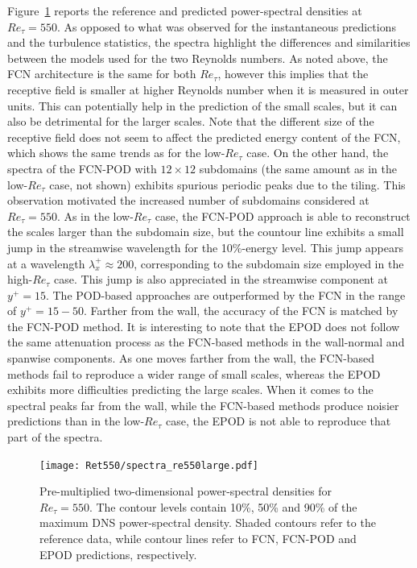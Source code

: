 Figure~\ref{fig:spectra550} reports the reference and predicted power-spectral densities at $Re_{\tau}=550$.
As opposed to what was observed for the instantaneous predictions and the turbulence statistics, the spectra highlight the differences and similarities between the models used for the two Reynolds numbers.
As noted above, the FCN architecture is the same for both $Re_{\tau}$, however this implies that the receptive field is smaller at higher Reynolds number when it is measured in outer units.
This can potentially help in the prediction of the small scales, but it can also be detrimental for the larger scales.
Note that the different size of the receptive field does not seem to affect the predicted energy content of the FCN, which shows the same trends as for the low-$Re_{\tau}$ case.
On the other hand, the spectra of the FCN-POD with $12\times12$ subdomains (the same amount as in the low-$Re_{\tau}$ case, not shown) exhibits spurious periodic peaks due to the tiling.
This observation motivated the increased number of subdomains considered at $Re_{\tau}=550$.
As in the low-$Re_{\tau}$ case, the FCN-POD approach is able to reconstruct the scales larger than the subdomain size, but the countour line exhibits a small jump in the streamwise wavelength for the 10\%-energy level.
This jump appears at a wavelength $\lambda_x^+ \approx 200$, corresponding to the subdomain size employed in the high-$Re_{\tau}$ case.
This jump is also appreciated in the streamwise component at $y^+=15$.
The POD-based approaches are outperformed by the FCN in the range of $y^+=15-50$.
Farther from the wall, the accuracy of the FCN is matched by the FCN-POD method. It is interesting to note that the EPOD does not follow the same attenuation process as the FCN-based methods in the wall-normal and spanwise components.
As one moves farther from the wall, the FCN-based methods fail to reproduce a wider range of small scales, whereas the EPOD exhibits more difficulties predicting the large scales.
When it comes to the spectral peaks far from the wall, while the FCN-based methods produce noisier predictions than in the low-$Re_{\tau}$ case, the EPOD is not able to reproduce that part of the spectra.

\begin{figure}
    \centerline{\texttt{[image: Ret550/spectra\_re550large.pdf]}}
    \caption{Pre-multiplied two-dimensional power-spectral densities for $Re_{\tau}=550$. The contour levels contain 10\%, 50\% and 90\% of the maximum DNS power-spectral density. Shaded contours refer to the reference data, while contour lines refer to  FCN,  FCN-POD and  EPOD predictions, respectively.}
    \label{fig:spectra550}
\end{figure}

